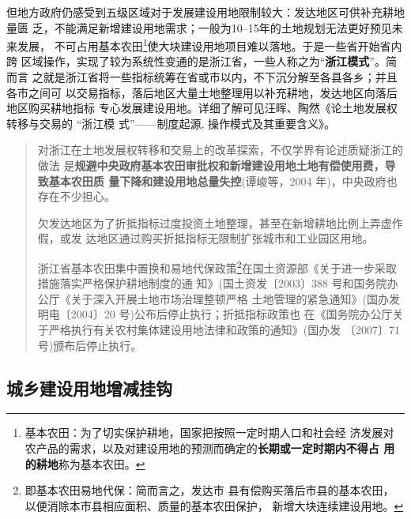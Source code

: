 但地方政府仍感受到五级区域对于发展建设用地限制较大：发达地区可供补充耕地量匮
乏，不能满足新增建设用地需求；一般为10--15年的土地规划无法更好预见未来发展，
不可占用基本农田\footnote{基本农田：为了切实保护耕地，国家把按照一定时期人口和社会经
  济发展对农产品的需求，以及对建设用地的预测而确定的\textbf{长期或一定时期内不得占
    用的耕地}称为基本农田。}使大块建设用地项目难以落地。于是一些省开始省内跨
区域操作，实现了较为系统性变通的是浙江省，一些人称之为“\textbf{浙江模式}”。简而言
之就是浙江省将一些指标统筹在省或市以内，不下沉分解至各县各乡；并且各市之间可
以交易指标，落后地区大量土地整理用以补充耕地，发达地区向落后地区购买耕地指标
专心发展建设用地。详细了解可见汪晖、陶然《论土地发展权转移与交易的 “浙江模
式”——制度起源, 操作模式及其重要含义》。


\begin{quotation}
  对浙江在土地发展权转移和交易上的改革探索，不仅学界有论述质疑浙江的做法
  是\textbf{规避中央政府基本农田审批权和新增建设用地土地有偿使用费，导致基本农田质
    量下降和建设用地总量失控}(谭峻等，2004 年)，中央政府也存在不少担心。

  欠发达地区为了折抵指标过度投资土地整理，甚至在新增耕地比例上弄虚作假，或发
  达地区通过购买折抵指标无限制扩张城市和工业园区用地。

  浙江省基本农田集中置换和易地代保政策\footnote{即基本农田易地代保：简而言之，发达市
    县有偿购买落后市县的基本农田，以便消除本市县相应面积、质量的基本农田保护，
    新增大块连续建设用地。}在国土资源部《关于进一步采取措施落实严格保护耕地制度的通
  知》(国土资发〔2003〕388 号和国务院办公厅《关于深入开展土地市场治理整顿严格
  土地管理的紧急通知》(国办发明电〔2004〕20 号)公布后停止执行；折抵指标政策也
  在《国务院办公厅关于严格执行有关农村集体建设用地法律和政策的通知》(国办发
  〔2007〕71 号)颁布后停止执行。\cite{wangzhejiang}
\end{quotation}





\subsection{城乡建设用地增减挂钩}

